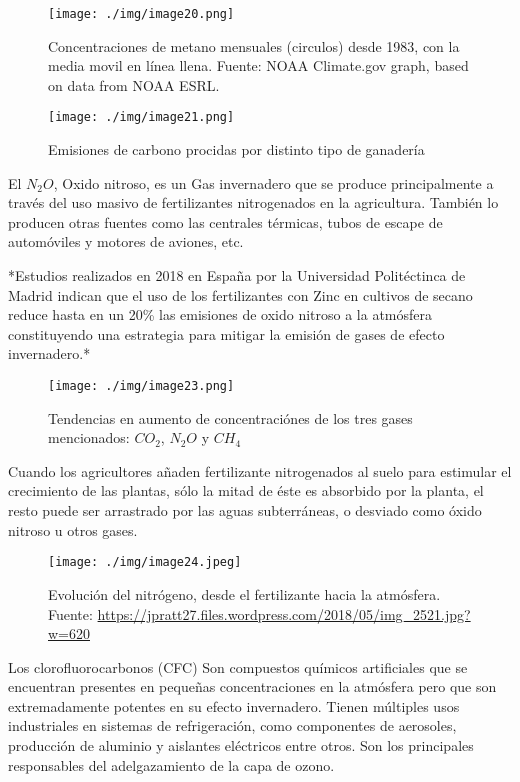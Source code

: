 \documentclass[
  a4paper,12pt]{extarticle}
\begin{document}
\begin{figure}
\centering
\texttt{[image: ./img/image20.png]}
\caption{Concentraciones de metano mensuales (circulos) desde 1983, con
la media movil en línea llena. Fuente: NOAA Climate.gov graph, based on
data from NOAA ESRL.}
\end{figure}

\begin{figure}
\centering
\texttt{[image: ./img/image21.png]}
\caption{Emisiones de carbono procidas por distinto tipo de ganadería}
\end{figure}

El \(N_2O\), Oxido nitroso, es un Gas invernadero que se produce
principalmente a través del uso masivo de fertilizantes nitrogenados en
la agricultura. También lo producen otras fuentes como las centrales
térmicas, tubos de escape de automóviles y motores de aviones, etc.

*Estudios realizados en 2018 en España por la Universidad Politéctinca
de Madrid indican que el uso de los fertilizantes con Zinc en cultivos
de secano reduce hasta en un 20\% las emisiones de oxido nitroso a la
atmósfera constituyendo una estrategia para mitigar la emisión de gases
de efecto invernadero.*

\begin{figure}
\centering
\texttt{[image: ./img/image23.png]}
\caption{Tendencias en aumento de concentraciónes de los tres gases
mencionados: \(CO_2\), \(N_2O\) y \(CH_4\)}
\end{figure}

Cuando los agricultores añaden fertilizante nitrogenados al suelo para
estimular el crecimiento de las plantas, sólo la mitad de éste es
absorbido por la planta, el resto puede ser arrastrado por las aguas
subterráneas, o desviado como óxido nitroso u otros gases.

\begin{figure}
\centering
\texttt{[image: ./img/image24.jpeg]}
\caption{Evolución del nitrógeno, desde el fertilizante hacia la
atmósfera. Fuente:
\url{https://jpratt27.files.wordpress.com/2018/05/img_2521.jpg?w=620}}
\end{figure}

Los clorofluorocarbonos (CFC) Son compuestos químicos artificiales que
se encuentran presentes en pequeñas concentraciones en la atmósfera pero
que son extremadamente potentes en su efecto invernadero. Tienen
múltiples usos industriales en sistemas de refrigeración, como
componentes de aerosoles, producción de aluminio y aislantes eléctricos
entre otros. Son los principales responsables del adelgazamiento de la
capa de ozono.
\end{document}
